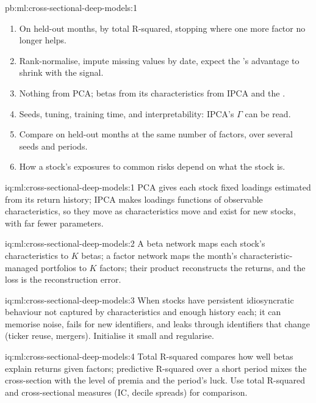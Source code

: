 \begin{solution}{pb:ml:cross-sectional-deep-models:1}
\begin{enumerate}
characteristics.
\item On held-out months, by total R-squared, stopping where one more factor no longer helps.
\item Rank-normalise, impute missing values by date, expect the 's advantage to shrink with the signal.
\item Nothing from PCA; betas from its characteristics from IPCA and the .
\item Seeds, tuning, training time, and interpretability: IPCA's $\Gamma$ can be read.
\item Compare on held-out months at the same number of factors, over several seeds and periods.
\item How a stock's exposures to common risks depend on what the stock is.
\end{enumerate}
\end{solution}

\begin{solution}{iq:ml:cross-sectional-deep-models:1}
PCA gives each stock fixed loadings estimated from its return history; IPCA makes loadings functions of observable
characteristics, so they move as characteristics move and exist for new stocks, with far fewer parameters.
\end{solution}

\begin{solution}{iq:ml:cross-sectional-deep-models:2}
A beta network maps each stock's characteristics to $K$ betas; a factor network maps the month's characteristic-managed
portfolios to $K$ factors; their product reconstructs the returns, and the loss is the reconstruction error.
\end{solution}

\begin{solution}{iq:ml:cross-sectional-deep-models:3}
When stocks have persistent idiosyncratic behaviour not captured by characteristics and enough history each; it can
memorise noise, fails for new identifiers, and leaks through identifiers that change (ticker reuse, mergers). Initialise it
small and regularise.
\end{solution}

\begin{solution}{iq:ml:cross-sectional-deep-models:4}
Total R-squared compares how well betas explain returns given factors; predictive R-squared over a short period mixes the
cross-section with the level of premia and the period's luck. Use total R-squared and cross-sectional measures (IC, decile
spreads) for comparison.
\end{solution}

